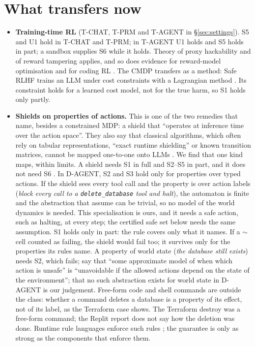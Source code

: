\documentclass{article}
\providecommand{\tightlist}{\setlength{\itemsep}{0pt}\setlength{\parskip}{0pt}}
\begin{document}
\begin{itemize}
\end{itemize}

\hypertarget{sec:transfer}{%
\section{What transfers now}\label{sec:transfer}}

\begin{itemize}
\tightlist
\item
  \textbf{Training-time RL} (T-CHAT, T-PRM and T-AGENT in §\ref{sec:settings}). S5 and U1 hold in T-CHAT and T-PRM; in T-AGENT U1 holds and S5 holds in part; a sandbox supplies S6 while it holds. Theory of proxy hackability \citep{skalse2022} and of reward tampering \citep{everitt2021} applies, and so does evidence for reward-model optimisation \citep{gao2023} and for coding RL \citep{macdiarmid2025}. The CMDP transfers as a method: Safe RLHF trains an LLM under cost constraints with a Lagrangian method \citep{dai2023}. Its constraint holds for a learned cost model, not for the true harm, so S1 holds only partly.
\item
  \textbf{Shields on properties of actions.} This is one of the two remedies that \citet[§3.6.2]{mclean2026} name, besides a constrained MDP: a shield that ``operates at inference time over the action space''. They also say that classical algorithms, which often rely on tabular representations, ``exact runtime shielding'' or known transition matrices, cannot be mapped one-to-one onto LLMs \citep[§5]{mclean2026}. We find that one kind maps, within limits. A shield needs S1 in full and S2--S5 in part, and it does not need S6 \citep{alshiekh2018}. In D-AGENT, S2 and S3 hold only for properties over typed actions. If the shield sees every tool call and the property is over action labels (\emph{block every call to a \texttt{delete\_database} tool and halt}), the automaton is finite and the abstraction that \citet{alshiekh2018} assume can be trivial, so no model of the world dynamics is needed. This specialisation is ours, and it needs a safe action, such as halting, at every step; the certified safe set below needs the same assumption. S1 holds only in part: the rule covers only what it names. If a \(\sim\) cell counted as failing, the shield would fail too; it survives only for the properties its rules name. A property of world state (\emph{the database still exists}) needs S2, which fails; \citet{alshiekh2018} say that ``some approximate model of when which action is unsafe'' is ``unavoidable if the allowed actions depend on the state of the environment''; that no such abstraction exists for world state in D-AGENT is our judgement. Free-form code and shell commands are outside the class: whether a command deletes a database is a property of its effect, not of its label, as the Terraform case shows. The Terraform destroy was a free-form command; the Replit report does not say how the deletion was done. Runtime rule languages enforce such rules \citep{wang2026}; the guarantee is only as strong as the components that enforce them.

\end{itemize}
\end{document}
